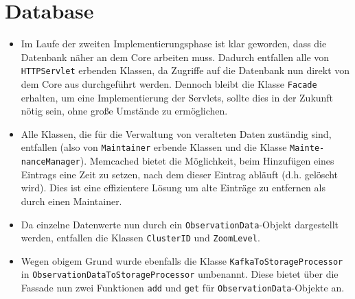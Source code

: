 \section{Database}
\begin{itemize}
	\item Im Laufe der zweiten Implementierungsphase ist klar geworden, dass die Datenbank näher an dem Core arbeiten muss. Dadurch entfallen alle von \texttt{HTTPServlet} erbenden Klassen, da Zugriffe auf die Datenbank nun direkt von dem Core aus durchgeführt werden. Dennoch bleibt die Klasse \texttt{Facade} erhalten, um eine Implementierung der Servlets, sollte dies in der Zukunft nötig sein, ohne große Umstände zu ermöglichen.
	\item Alle Klassen, die für die Verwaltung von veralteten Daten zuständig sind, entfallen (also von \texttt{Maintainer} erbende Klassen und die Klasse \texttt{Mainte-\\nanceManager}). Memcached bietet die Möglichkeit, beim Hinzufügen eines Eintrags eine Zeit zu setzen, nach dem dieser Eintrag abläuft (d.h. gelöscht wird). Dies ist eine effizientere Lösung um alte Einträge zu entfernen als durch einen Maintainer.
	\item Da einzelne Datenwerte nun durch ein \texttt{ObservationData}-Objekt dargestellt werden, entfallen die Klassen \texttt{ClusterID} und \texttt{ZoomLevel}.
	\item Wegen obigem Grund wurde ebenfalls die Klasse \texttt{KafkaToStorageProcessor} in \texttt{ObservationDataToStorageProcessor} umbenannt. Diese bietet über die Fassade nun zwei Funktionen \texttt{add} und \texttt{get} für \texttt{ObservationData}-Objekte an.
\end{itemize}